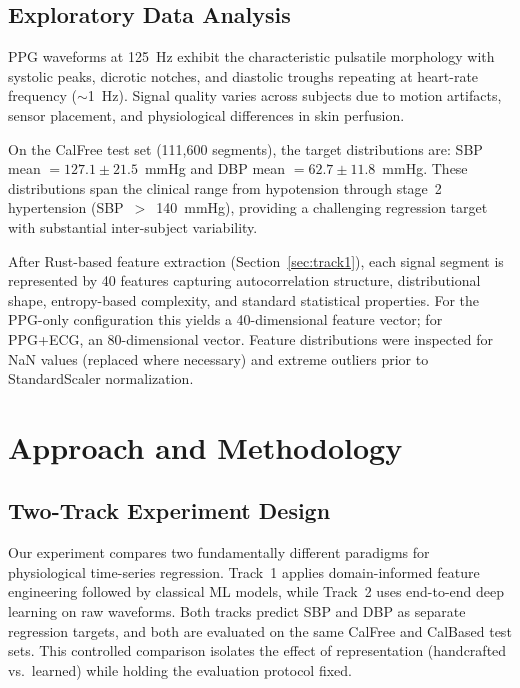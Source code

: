 \documentclass[11pt]{article}
\begin{document}
\subsection{Exploratory Data Analysis}

PPG waveforms at 125~Hz exhibit the characteristic pulsatile morphology with systolic peaks, dicrotic notches, and diastolic troughs repeating at heart-rate frequency ($\sim$1~Hz). Signal quality varies across subjects due to motion artifacts, sensor placement, and physiological differences in skin perfusion.

On the CalFree test set (111,600 segments), the target distributions are: SBP mean $= 127.1 \pm 21.5$~mmHg and DBP mean $= 62.7 \pm 11.8$~mmHg. These distributions span the clinical range from hypotension through stage~2 hypertension (SBP~$>$~140~mmHg), providing a challenging regression target with substantial inter-subject variability.

After Rust-based feature extraction (Section~\ref{sec:track1}), each signal segment is represented by 40 features capturing autocorrelation structure, distributional shape, entropy-based complexity, and standard statistical properties. For the PPG-only configuration this yields a 40-dimensional feature vector; for PPG+ECG, an 80-dimensional vector. Feature distributions were inspected for NaN values (replaced where necessary) and extreme outliers prior to StandardScaler normalization.

\section{Approach and Methodology}

\subsection{Two-Track Experiment Design}

Our experiment compares two fundamentally different paradigms for physiological time-series regression. Track~1 applies domain-informed feature engineering followed by classical ML models, while Track~2 uses end-to-end deep learning on raw waveforms. Both tracks predict SBP and DBP as separate regression targets, and both are evaluated on the same CalFree and CalBased test sets. This controlled comparison isolates the effect of representation (handcrafted vs.\ learned) while holding the evaluation protocol fixed.
\end{document}
